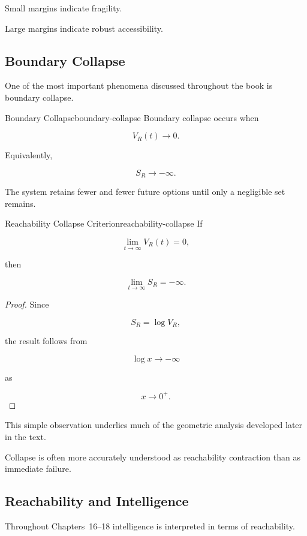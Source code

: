 \documentclass[12pt,twoside,openright]{book}
\begin{document}
Small margins indicate fragility.

Large margins indicate robust accessibility.

\subsection{Boundary Collapse}

One of the most important phenomena discussed throughout
the book is boundary collapse.

\begin{definition}{Boundary Collapse}{boundary-collapse}
Boundary collapse occurs when

\[
V_R(t)
\rightarrow0.
\]
\end{definition}

Equivalently,

\[
S_R
\rightarrow
-\infty.
\]

The system retains fewer and fewer future options until
only a negligible set remains.

\begin{theorem}{Reachability Collapse Criterion}{reachability-collapse}
If

\[
\lim_{t\to\infty}
V_R(t)
=

0,
\]

then

\[
\lim_{t\to\infty}
S_R
=

-\infty.
\]
\end{theorem}

\begin{proof}
Since

\[
S_R
=

\log V_R,
\]

the result follows from

\[
\log x
\rightarrow
-\infty
\]

as

\[
x\rightarrow0^+.
\]
\end{proof}

This simple observation underlies much of the geometric
analysis developed later in the text.

Collapse is often more accurately understood as
reachability contraction than as immediate failure.

\subsection{Reachability and Intelligence}

Throughout Chapters~16--18 intelligence is interpreted in
terms of reachability.
\end{document}
